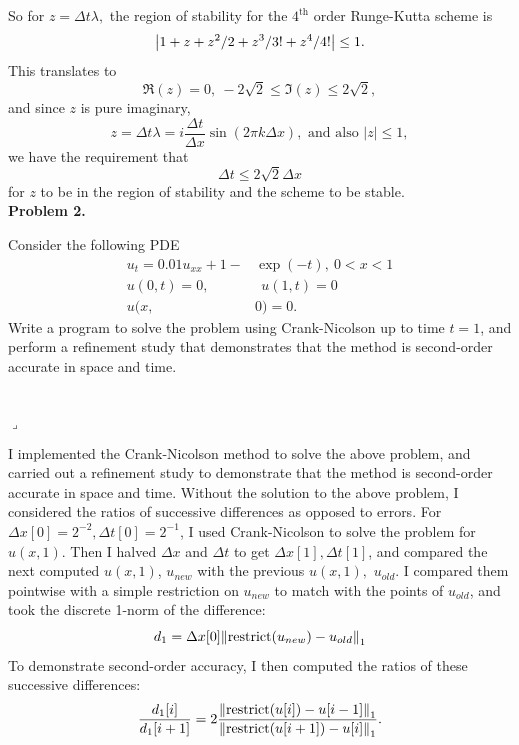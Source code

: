 \documentclass[12pt]{article}
\newenvironment{myprob}[1]
    {%
    \noindent{\Huge$\ulcorner$}\textbf{#1.}\begin{em}
    }
    { 
    \end{em} \\ \hphantom{l} \hfill {\Huge$\lrcorner$} }
\begin{document}
So for $z = \Delta t \lambda,$ the region of stability for the $4^{\text{th}}$ order Runge-Kutta scheme is
$$\abs{1 + z + z^2/2 + z^3/3! + z^4/4!} \leq 1.$$
This translates to $$\Re(z)=0,\  -2\sqrt{2} \leq \Im(z) \leq 2\sqrt{2},$$ 
and since $z$ is pure imaginary, $$z = \Delta t \lambda = i \dfrac{\Delta t}{\Delta x} \sin(2 \pi k \Delta x), \text{ and also } |z| \leq 1,$$
we have the requirement that 
$$ \Delta t \leq 2 \sqrt{2} \Delta x$$
for $z$ to be in the region of stability and the scheme to be stable.\\

\begin{myprob}{Problem 2}
Consider the following PDE
\begin{align*}
u_t = 0.01 u_{xx} + 1 - &\exp(-t), \ 0<x<1 \\
u(0,t)=0, &\ \ u(1,t)=0 \\
u(x,&0) = 0.
\end{align*}
Write a program to solve the problem using Crank-Nicolson up to time $t=1$, and perform a refinement study that demonstrates that the method is second-order accurate in space and time.
\end{myprob}

I implemented the Crank-Nicolson method to solve the above problem, and carried out a refinement study to demonstrate that the method is second-order accurate in space and time.  Without the solution to the above problem, I considered the ratios of successive differences as opposed to errors.  For $\Delta x[0]=2^{-2}, \Delta t[0]=2^{-1}$, I used Crank-Nicolson to solve the problem for $u(x,1)$.  Then I halved $\Delta x$ and $\Delta t$ to get $\Delta x[1], \Delta t[1]$, and compared the next computed $u(x,1)$, $u_{new}$ with the previous $u(x,1),$ $u_{old}$.  I compared them pointwise with a simple restriction on $u_{new}$ to match with the points of $u_{old}$, and took the discrete 1-norm of the difference:
$$d_1 = \Delta x[0] \norm{\text{restrict}(u_{new})-u_{old}}_1 $$
To demonstrate second-order accuracy, I then computed the ratios of these successive differences:
$$\dfrac{d_1[i]}{d_1[i+1]} = 2 \dfrac{\norm{\text{restrict}(u[i])-u[i-1]}_1 }{\norm{\text{restrict}(u[i+1])-u[i]}_1 }.$$
\end{document}
